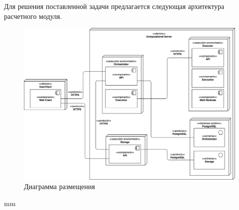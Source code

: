 Для решения поставленной задачи предлагается следующая архитектура расчетного модуля.

\begin{figure}[H]
	\hspace*{-2.5 cm}\includegraphics[width=\textwidth, left]{architecture/pictures/common/deployment_diagram}
	\caption{Диаграмма размещения}
	\label{pic:architecture__deployment-diagram}
\end{figure}
 mm


